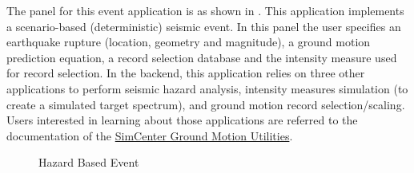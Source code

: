 The panel for this event application is as shown in
. This application implements a scenario-based
(deterministic) seismic event.  In this panel the user specifies an
earthquake rupture (location, geometry and magnitude), a ground motion
prediction equation, a record selection database and the intensity
measure used for record selection. In the backend, this application
relies on three other applications to perform seismic hazard analysis,
intensity measures simulation (to create a simulated target spectrum),
and ground motion record selection/scaling. Users interested in
learning about those applications are referred to the documentation of
the
\href{https://github.com/NHERI-SimCenter/GroundMotionUtilities/blob/master/Readme.md}{SimCenter
  Ground Motion Utilities}.

\begin{figure}[!htbp]
  \caption{Hazard Based Event}
  \label{fig:hazard_based_event_panel}
\end{figure}
